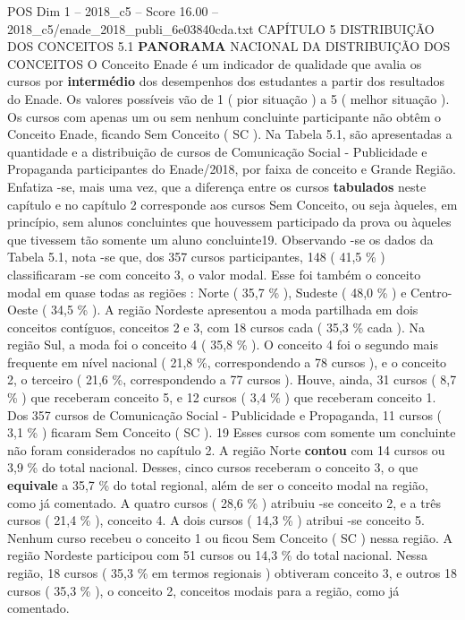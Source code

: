 \begin{textsample}{POS Dim 1 – 2018\_c5 – Score 16.00 – 2018\_c5/enade\_2018\_publi\_6e03840cda.txt}  \label{ex:f1_pos_062}
CAPÍTULO 5 DISTRIBUIÇÃO DOS CONCEITOS 5.1 \textbf{PANORAMA} NACIONAL DA DISTRIBUIÇÃO DOS CONCEITOS O Conceito Enade é um indicador de qualidade que avalia os cursos por \textbf{intermédio} dos desempenhos dos estudantes a partir dos resultados do Enade.
Os valores possíveis vão de 1 ( pior situação ) a 5 ( melhor situação ).
Os cursos com apenas um ou sem nenhum concluinte participante não obtêm o Conceito Enade, ficando Sem Conceito ( SC ).
Na Tabela 5.1, são apresentadas a quantidade e a distribuição de cursos de Comunicação Social - Publicidade e Propaganda participantes do Enade/2018, por faixa de conceito e Grande Região.
Enfatiza -se, mais uma vez, que a diferença entre os cursos \textbf{tabulados} neste capítulo e no capítulo 2 corresponde aos cursos Sem Conceito, ou seja àqueles, em princípio, sem alunos concluintes que houvessem participado da prova ou àqueles que tivessem tão somente um aluno concluinte19.
Observando -se os dados da Tabela 5.1, nota -se que, dos 357 cursos participantes, 148 ( 41,5 \% ) classificaram -se com conceito 3, o valor modal.
Esse foi também o conceito modal em quase todas as regiões : Norte ( 35,7 \% ), Sudeste ( 48,0 \% ) e Centro-Oeste ( 34,5 \% ).
A região Nordeste apresentou a moda partilhada em dois conceitos contíguos, conceitos 2 e 3, com 18 cursos cada ( 35,3 \% cada ).
Na região Sul, a moda foi o conceito 4 ( 35,8 \% ).
O conceito 4 foi o segundo mais frequente em nível nacional ( 21,8 \%, correspondendo a 78 cursos ), e o conceito 2, o terceiro ( 21,6 \%, correspondendo a 77 cursos ).
Houve, ainda, 31 cursos ( 8,7 \% ) que receberam conceito 5, e 12 cursos ( 3,4 \% ) que receberam conceito 1.
Dos 357 cursos de Comunicação Social - Publicidade e Propaganda, 11 cursos ( 3,1 \% ) ficaram Sem Conceito ( SC ). 19 Esses cursos com somente um concluinte não foram considerados no capítulo 2.
A região Norte \textbf{contou} com 14 cursos ou 3,9 \% do total nacional.
Desses, cinco cursos receberam o conceito 3, o que \textbf{equivale} a 35,7 \% do total regional, além de ser o conceito modal na região, como já comentado.
A quatro cursos ( 28,6 \% ) atribuiu -se conceito 2, e a três cursos ( 21,4 \% ), conceito 4.
A dois cursos ( 14,3 \% ) atribui -se conceito 5.
Nenhum curso recebeu o conceito 1 ou ficou Sem Conceito ( SC ) nessa região.
A região Nordeste participou com 51 cursos ou 14,3 \% do total nacional.
Nessa região, 18 cursos ( 35,3 \% em termos regionais ) obtiveram conceito 3, e outros 18 cursos ( 35,3 \% ), o conceito 2, conceitos modais para a região, como já comentado.

\end{textsample}
